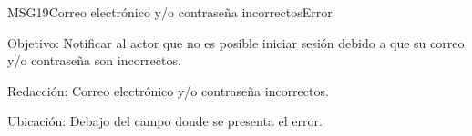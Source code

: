 \begin{mensaje}{MSG19}{Correo electrónico y/o contraseña incorrectos}{Error}
	\item [Objetivo:] Notificar al actor que no es posible iniciar sesión debido a que su correo y/o contraseña son incorrectos.
	\item[Redacción:] Correo electrónico y/o contraseña incorrectos.
	\item [Ubicación:] Debajo del campo donde se presenta el error.
\end{mensaje}